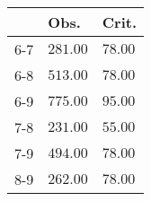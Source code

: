 \begin{table}[ht]
\centering
\begin{tabular}{rll}
  \hline
 & Obs. & Crit. \\ 
  \hline
6-7 & \(\mathbf{281.00}\) & \(\mathbf{78.00}\) \\ 
  6-8 & \(\mathbf{513.00}\) & \(\mathbf{78.00}\) \\ 
  6-9 & \(\mathbf{775.00}\) & \(\mathbf{95.00}\) \\ 
  7-8 & \(\mathbf{231.00}\) & \(\mathbf{55.00}\) \\ 
  7-9 & \(\mathbf{494.00}\) & \(\mathbf{78.00}\) \\ 
  8-9 & \(\mathbf{262.00}\) & \(\mathbf{78.00}\) \\ 
   \hline
\end{tabular}
\end{table}
